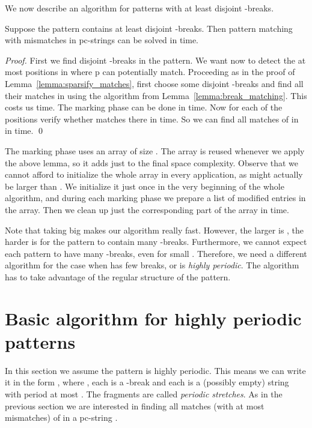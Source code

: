 \documentclass[runningheads]{llncs}
\begin{document}
We now describe an algorithm for patterns with at least  disjoint -breaks.

\begin{theorem}\label{theorem:algorithm_nonperiodic}
Suppose the pattern contains at least  disjoint -breaks. Then pattern matching with  mismatches in pc-strings can be solved in  time.
\end{theorem}

\begin{proof}
First we find  disjoint -breaks in the pattern. We want now to detect the at most  positions in  where p can potentially match. Proceeding as in the proof of Lemma~\ref{lemma:sparsify_matches}, first choose some  disjoint -breaks and find all their matches in  using the algorithm from Lemma~\ref{lemma:break_matching}. This costs us  time. The marking phase can be done in  time. Now for each of the  positions verify whether  matches there in  time. So we can find all matches of  in  in  time.
\qed
\end{proof}

\begin{remark}
The marking phase uses an array of size . The array is reused whenever we apply the above lemma, so it adds just  to the final space complexity.
Observe that we cannot afford to initialize the whole array in every application, as  might actually be larger than .
We initialize it just once in the very beginning of the whole algorithm, and during each marking phase we prepare a list of modified entries in the array. Then we clean up
just the corresponding part of the array in  time.
\end{remark}

Note that taking big  makes our algorithm really fast. However, the larger is , the harder is for the pattern to contain many -breaks. Furthermore, we cannot expect each pattern to have many -breaks, even for small . Therefore, we need a different algorithm for the case when  has few breaks, or is {\it highly periodic}. The algorithm has to take advantage of the regular structure of the pattern.

\section{Basic algorithm for highly periodic patterns}

\label{section:highly}
In this section we assume the pattern is highly periodic. This means we can write it in the form , where , each  is a -break and each  is a (possibly empty) string with period at most . The fragments  are called {\it periodic stretches}.  As in the previous section we are interested in finding all matches (with at most  mismatches) of  in a pc-string . 
\end{document}
